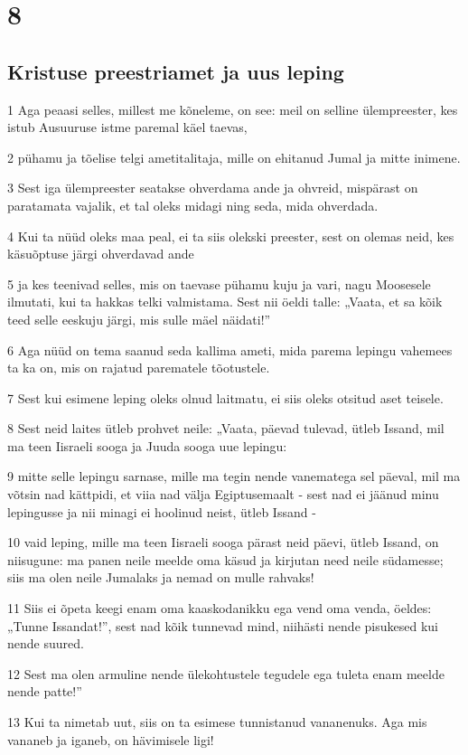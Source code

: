 \chapter{8}

\section*{Kristuse preestriamet ja uus leping}

\par 1 Aga peaasi selles, millest me kõneleme, on see: meil on selline ülempreester, kes istub Ausuuruse istme paremal käel taevas,
\par 2 pühamu ja tõelise telgi ametitalitaja, mille on ehitanud Jumal ja mitte inimene.
\par 3 Sest iga ülempreester seatakse ohverdama ande ja ohvreid, mispärast on paratamata vajalik, et tal oleks midagi ning seda, mida ohverdada.
\par 4 Kui ta nüüd oleks maa peal, ei ta siis olekski preester, sest on olemas neid, kes käsuõptuse järgi ohverdavad ande
\par 5 ja kes teenivad selles, mis on taevase pühamu kuju ja vari, nagu Moosesele ilmutati, kui ta hakkas telki valmistama. Sest nii öeldi talle: „Vaata, et sa kõik teed selle eeskuju järgi, mis sulle mäel näidati!”
\par 6 Aga nüüd on tema saanud seda kallima ameti, mida parema lepingu vahemees ta ka on, mis on rajatud parematele tõotustele.
\par 7 Sest kui esimene leping oleks olnud laitmatu, ei siis oleks otsitud aset teisele.
\par 8 Sest neid laites ütleb prohvet neile: „Vaata, päevad tulevad, ütleb Issand, mil ma teen Iisraeli sooga ja Juuda sooga uue lepingu:
\par 9 mitte selle lepingu sarnase, mille ma tegin nende vanematega sel päeval, mil ma võtsin nad kättpidi, et viia nad välja Egiptusemaalt - sest nad ei jäänud minu lepingusse ja nii minagi ei hoolinud neist, ütleb Issand -
\par 10 vaid leping, mille ma teen Iisraeli sooga pärast neid päevi, ütleb Issand, on niisugune: ma panen neile meelde oma käsud ja kirjutan need neile südamesse; siis ma olen neile Jumalaks ja nemad on mulle rahvaks!
\par 11 Siis ei õpeta keegi enam oma kaaskodanikku ega vend oma venda, öeldes: „Tunne Issandat!”, sest nad kõik tunnevad mind, niihästi nende pisukesed kui nende suured.
\par 12 Sest ma olen armuline nende ülekohtustele tegudele ega tuleta enam meelde nende patte!”
\par 13 Kui ta nimetab uut, siis on ta esimese tunnistanud vananenuks. Aga mis vananeb ja iganeb, on hävimisele ligi!


